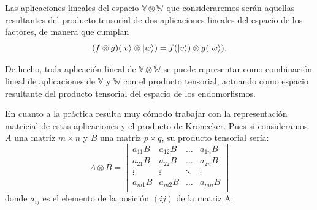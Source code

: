 \documentclass[a4paper]{article}
\numberwithin{equation}{section}
\begin{document}
Las aplicaciones lineales del espacio $\mathbb{V}\otimes\mathbb{W}$ que consideraremos serán aquellas resultantes del producto tensorial de dos aplicaciones lineales del espacio de los factores, de manera que cumplan
\begin{equation} \label{prtensorial_aplineal}
(f\otimes g) (\ket{v}\otimes\ket{w}) = f(\ket{v}) \otimes g(\ket{w}).
\end{equation}

De hecho, toda aplicación lineal de $\mathbb{V}\otimes\mathbb{W}$ se puede representar como combinación lineal de aplicaciones de $\mathbb{V}$ y $\mathbb{W}$ con el producto tensorial, actuando como espacio resultante del producto tensorial del espacio de los endomorfismos.

En cuanto a la práctica resulta muy cómodo trabajar con la representación matricial de estas aplicaciones y el producto de Kronecker. Pues si consideramos $A$ una matriz $m\times n$ y $B$ una matriz $p\times q$, su producto tensorial sería:
\begin{equation}
A\otimes B =
\begin{bmatrix}
a_{11}B & a_{12}B & \ldots & a_{1n}B \\
a_{21}B & a_{22}B & \ldots & a_{2n}B \\
\vdots & \vdots & \ddots & \vdots \\
a_{m1}B & a_{m2}B & \ldots & a_{mn}B \\
\end{bmatrix}
\end{equation}
donde $a_{ij}$ es el elemento de la posición $(ij)$ de la matriz A.
\end{document}
